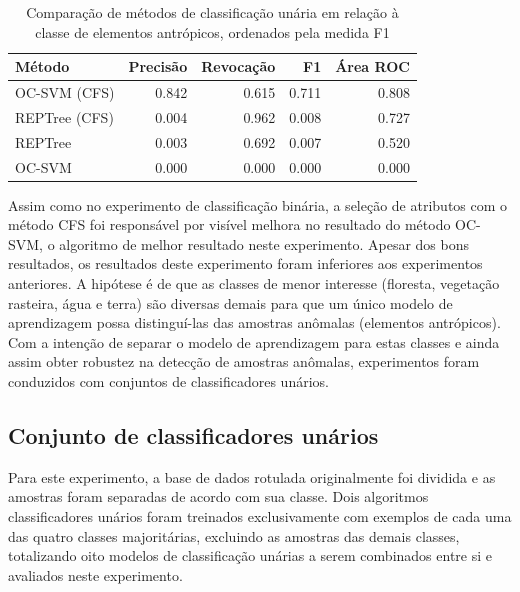 \begin{table}[h]
\centering
\begin{tabulary}{\linewidth}{|L|R|R|R|R|}
\hline
\textbf{Método} & \textbf{Precisão} & \textbf{Revocação} & \textbf{F1} & \textbf{Área ROC} \\ \hline
OC-SVM (CFS)  & 0.842 & 0.615 & 0.711 & 0.808 \\ \hline
REPTree (CFS) & 0.004 & 0.962 & 0.008 & 0.727 \\ \hline
REPTree       & 0.003 & 0.692 & 0.007 & 0.520 \\ \hline
OC-SVM        & 0.000 & 0.000 & 0.000 & 0.000 \\ \hline
\end{tabulary}
\caption{Comparação de métodos de classificação unária em relação à classe de elementos antrópicos, ordenados pela medida F1}
\label{tab:experimentoUniclasseAntropico}
\end{table}


Assim como no experimento de classificação binária, a seleção de atributos com o método CFS foi responsável por visível melhora no resultado do método OC-SVM, o algoritmo de melhor resultado neste experimento. Apesar dos bons resultados, os resultados deste experimento foram inferiores aos experimentos anteriores. A hipótese é de que as classes de menor interesse (floresta, vegetação rasteira, água e terra) são diversas demais para que um único modelo de aprendizagem possa distinguí-las das amostras anômalas (elementos antrópicos). Com a intenção de separar o modelo de aprendizagem para estas classes e ainda assim obter robustez na detecção de amostras anômalas, experimentos foram conduzidos com conjuntos de classificadores unários.

\subsection{Conjunto de classificadores unários}

Para este experimento, a base de dados rotulada originalmente foi dividida e as amostras foram separadas de acordo com sua classe. Dois algoritmos classificadores unários foram treinados exclusivamente com exemplos de cada uma das quatro classes majoritárias, excluindo as amostras das demais classes, totalizando oito modelos de classificação unárias a serem combinados entre si e avaliados neste experimento.

